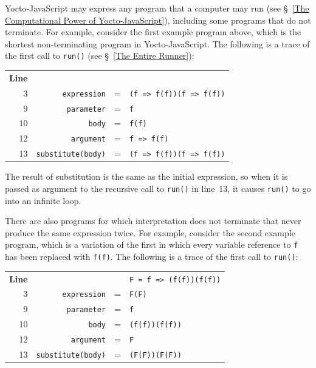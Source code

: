 \documentclass[12pt, oneside]{book}
\begin{document}
Yocto-JavaScript may express any program that a computer may run (see §~\ref{The Computational Power of Yocto-JavaScript}), including some programs that do not terminate. For example, consider the first example program above, which is the shortest non-terminating program in Yocto-JavaScript. The following is a trace of the first call to \texttt{run()} (see §~\ref{The Entire Runner}):

\begin{center}
\begin{tabular}{rrcl}
\textbf{Line}&&&\\
3 & \texttt{expression} & = & \texttt{(f => f(f))(f => f(f))}\\
9 & \texttt{parameter} & = & \texttt{f}\\
10 & \texttt{body} & = & \texttt{f(f)}\\
12 & \texttt{argument} & = & \texttt{f => f(f)}\\
13 & \texttt{substitute(body)} & = & \texttt{(f => f(f))(f => f(f))}\\
\end{tabular}
\end{center}

The result of substitution is the same as the initial expression, so when it is passed as argument to the recursive call to \texttt{run()} in line~13, it causes \texttt{run()} to go into an infinite loop.

There are also programs for which interpretation does not terminate that never produce the same expression twice. For example, consider the second example program, which is a variation of the first in which every variable reference to \texttt{f} has been replaced with \texttt{f(f)}. The following is a trace of the first call to \texttt{run()}:

\begin{center}
\begin{tabular}{rrcl}
\textbf{Line}&&&\texttt{F = f => (f(f))(f(f))}\\
3 & \texttt{expression} & = & \texttt{F(F)}\\
9 & \texttt{parameter} & = & \texttt{f}\\
10 & \texttt{body} & = & \texttt{(f(f))(f(f))}\\
12 & \texttt{argument} & = & \texttt{F}\\
13 & \texttt{substitute(body)} & = & \texttt{(F(F))(F(F))}\\
\end{tabular}
\end{center}
\end{document}
